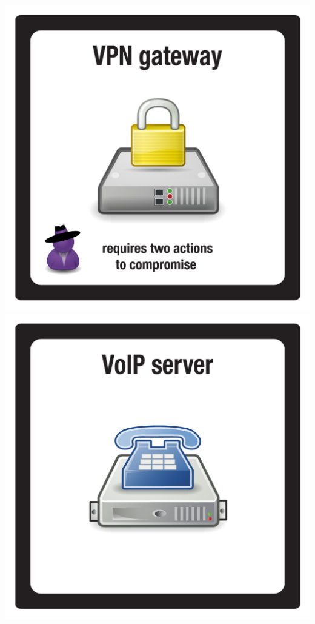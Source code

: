 \documentclass{letter}
\begin{document}
\includegraphics{tiles/node_vpn_gateway}
\includegraphics{tiles/node_voip_server} \\
\end{document}
